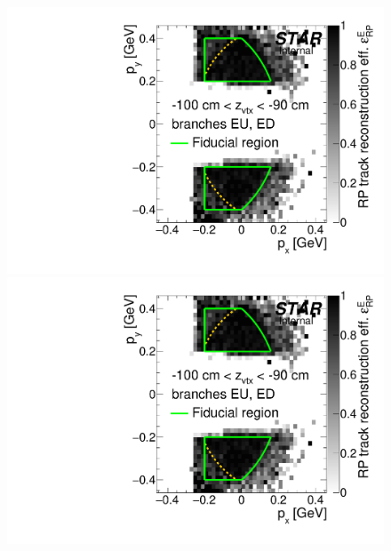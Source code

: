 \begin{figure}[hb]
{  \includegraphics[width=\linewidth,page=4]{graphics/corrections/mcFullEffPxPy.pdf}\\
  \includegraphics[width=\linewidth,page=6]{graphics/corrections/mcFullEffPxPy.pdf}
}%
\end{figure}%
